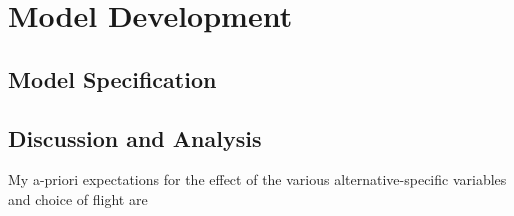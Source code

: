 \section{Model Development}
\subsection{Model Specification}
\subsection{Discussion and Analysis}
My a-priori expectations for the effect of the various alternative-specific variables and choice of flight are 